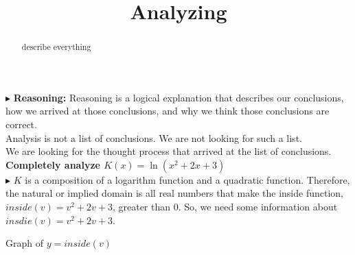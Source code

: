 \documentclass{ximera}
\title{Analyzing}
\begin{document}
\begin{abstract}
describe everything
\end{abstract}
\maketitle



$\blacktriangleright$ \textbf{\textcolor{red!80!black}{Reasoning:}} Reasoning is a logical explanation that describes our conclusions, how we arrived at those conclusions, and why we think those conclusions are correct. \\

Analysis is not a list of conclusions. We are not looking for such a list. \\

We are looking for the thought process that arrived at the list of conclusions. \\



\textbf{Completely analyze $K(x) = \ln(x^2+2x+3)$} \\

$\blacktriangleright$  $K$ is a composition of a logarithm function and a quadratic function. Therefore, the natural or implied domain is all real numbers that make the inside function, $inside(v)=v^2+2v+3$, greater than $0$.  So, we need some information about $insdie(v)=v^2+2v+3$.   





Graph of $y = inside(v)$




\begin{image}
\end{image}
\end{document}
